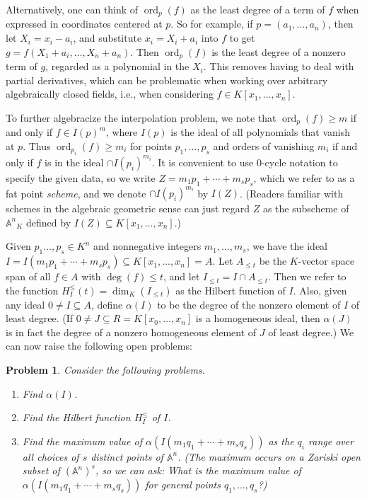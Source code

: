 \documentclass[11pt,twoside]{amsart}
\numberwithin{equation}{section}
\newtheorem{problem}[theorem]{Problem}
\theoremstyle{definition}
\begin{document}
Alternatively, one can think of $\operatorname{ord}_p(f)$ as the least degree of 
a term of $f$ when expressed in coordinates centered at $p$. So for example,
if $p=(a_1,\ldots,a_n)$, then let $X_i=x_i-a_i$, and substitute $x_i=X_i+a_i$ into
$f$ to get $g=f(X_1+a_i,\ldots,X_n+a_n)$. Then $\operatorname{ord}_p(f)$ is the least degree of
a nonzero term of $g$, regarded as a polynomial in the $X_i$. This removes
having to deal with partial derivatives, which can be problematic 
when working over arbitrary algebraically closed fields, i.e., 
when considering $f\in {K}[x_1,\ldots,x_n]$.

To further algebracize the interpolation problem, we note that $\operatorname{ord}_p(f)\geq m$
if and only if $f\in I(p)^m$, where $I(p)$ is the ideal of all polynomials
that vanish at $p$. Thus $\operatorname{ord}_{p_i}(f)\geq m_i$ for 
points $p_1,\ldots,p_s$ and orders of vanishing $m_i$ if and only if
$f$ is in the ideal $\cap I(p_i)^{m_i}$. It is convenient to use 0-cycle notation
to specify the given data, so we write $Z=m_1p_1+\cdots+m_sp_s$, which we refer to
as a fat point \emph{scheme}, and we denote $\cap I(p_i)^{m_i}$ by $I(Z)$.
(Readers familiar with schemes in the algebraic geometric sense can just
regard $Z$ as the subscheme of ${\mathbb{A}^{{n}}}_{K}$ defined by 
$I(Z)\subseteq {K}[x_1,\ldots,x_n]$.)

Given $p_1\ldots,p_s\in{K}^n$ and nonnegative integers
$m_1,\ldots,m_s$, we have the ideal $I=I(m_1p_1+\cdots+m_sp_s)\subseteq {K}[x_1,\ldots,x_n]=A$.
Let $A_{\leq t}$ be the ${K}$-vector space span of all $f\in A$ with $\deg(f)\leq t$,
and let $I_{\leq t}=I\cap A_{\leq t}$. Then we refer to the function 
$H^{\leq}_I(t)=\dim_{K}(I_{\leq t})$
as the Hilbert function of $I$. 
Also, given any ideal $0\neq I\subseteq A$, define $\alpha(I)$ to be 
the degree of the nonzero element of $I$ of least degree.
(If $0\neq J\subseteq R={K}[x_0,\ldots,x_n]$ is a homogeneous ideal, then $\alpha(J)$
is in fact the degree of a nonzero homogeneous element of $J$ of least degree.)
We can now raise the following open problems:

\begin{problem} Consider the following problems.
\begin{enumerate}
\item Find $\alpha(I)$.
\item Find the Hilbert function $H^{\leq}_I$ of $I$.
\item Find the maximum value of $\alpha(I(m_1q_1+\cdots+m_sq_s))$
as the $q_i$ range over all choices of $s$ distinct points of ${\mathbb{A}^{{n}}}$.
(The maximum occurs on a Zariski open subset of $({\mathbb{A}^{{n}}})^s$,
so we can ask: What is the maximum value of 
$\alpha(I(m_1q_1+\cdots+m_sq_s))$ for general points
$q_1,\ldots,q_s$?)
\end{enumerate}
\end{problem}
\end{document}

